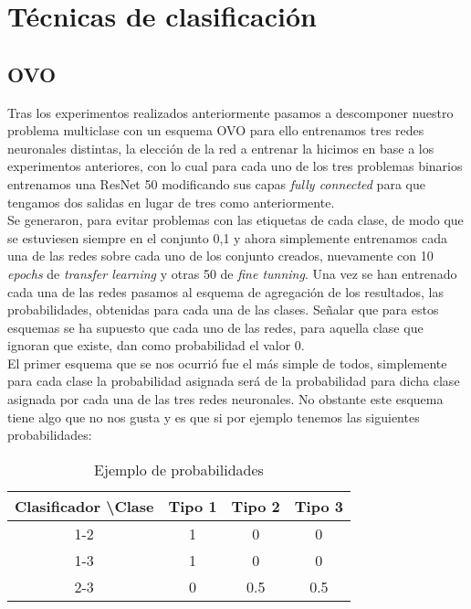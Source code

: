 \section{Técnicas de clasificación}

\subsection{OVO}

Tras los experimentos realizados anteriormente pasamos a descomponer nuestro problema multiclase con un esquema OVO para ello entrenamos tres redes neuronales distintas, la elección de la red a entrenar la hicimos en base a los experimentos anteriores, con lo cual para cada uno de los tres problemas binarios entrenamos una ResNet 50 modificando sus capas \textit{fully connected} para que tengamos dos salidas en lugar de tres como anteriormente.\\

Se generaron, para evitar problemas con las etiquetas de cada clase, de modo que se estuviesen siempre en el conjunto {0,1} y ahora simplemente entrenamos cada una de las redes sobre cada uno de los conjunto creados, nuevamente con 10 \textit{epochs} de \textit{transfer learning} y otras 50 de \textit{fine tunning}. Una vez se han entrenado cada una de las redes pasamos al esquema de agregación de los resultados, las probabilidades, obtenidas para cada una de las clases. Señalar que para estos esquemas se ha supuesto que cada uno de las redes, para aquella clase que ignoran que existe, dan como probabilidad el valor 0.\\

El primer esquema que se nos ocurrió fue el más simple de todos, simplemente para cada clase la probabilidad asignada será  de la probabilidad para dicha clase asignada por cada una de las tres redes neuronales. No obstante este esquema tiene algo que no nos gusta y es que si por ejemplo tenemos las siguientes probabilidades:

\begin{table}[H]
\centering
\caption{Ejemplo de probabilidades}
\label{my-label}
\begin{tabular}{|c|c|c|c|}
\hline
Clasificador \textbackslash Clase & Tipo 1 & Tipo 2 & Tipo 3 \\ \hline
1-2                               & 1      & 0      & 0      \\ \hline
1-3                               & 1      & 0      & 0      \\ \hline
2-3                               & 0      & 0.5    & 0.5    \\ \hline
\end{tabular}
\end{table}

